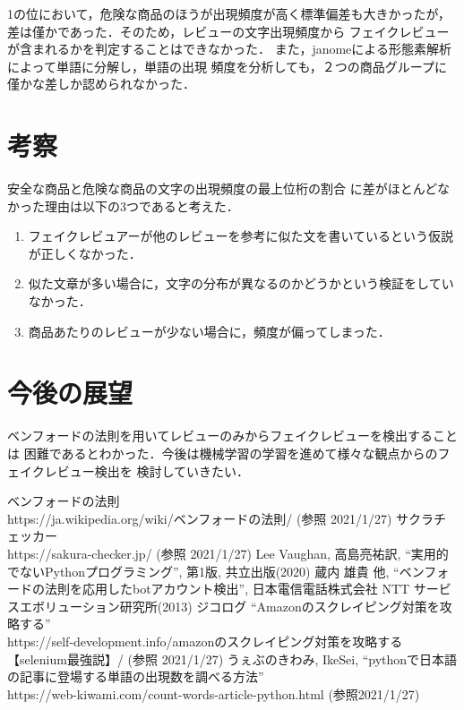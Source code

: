 \documentclass[a4paper, twocolumn]{jsarticle}
\begin{document}
1の位において，危険な商品のほうが出現頻度が高く標準偏差も大きかったが，
差は僅かであった．そのため，レビューの文字出現頻度から
フェイクレビューが含まれるかを判定することはできなかった．
また，janomeによる形態素解析によって単語に分解し，単語の出現
頻度を分析しても，２つの商品グループに僅かな差しか認められなかった．

\section{考察}
安全な商品と危険な商品の文字の出現頻度の最上位桁の割合
に差がほとんどなかった理由は以下の3つであると考えた．

\begin{enumerate}
  \item フェイクレビュアーが他のレビューを参考に似た文を書いているという仮説が正しくなかった．
  \item 似た文章が多い場合に，文字の分布が異なるのかどうかという検証をしていなかった．
  \item 商品あたりのレビューが少ない場合に，頻度が偏ってしまった．
\end{enumerate}


\section{今後の展望}
ベンフォードの法則を用いてレビューのみからフェイクレビューを検出することは
困難であるとわかった．今後は機械学習の学習を進めて様々な観点からのフェイクレビュー検出を
検討していきたい．

\begin{thebibliography}{99}
   ベンフォードの法則 \\ https://ja.wikipedia.org/wiki/ベンフォードの法則/ (参照 2021/1/27)
   サクラチェッカー \\ https://sakura-checker.jp/ (参照 2021/1/27)
   Lee Vaughan, 高島亮祐訳, ``実用的でないPythonプログラミング'', 第1版, 共立出版(2020)
   蔵内 雄貴 他, ``ベンフォードの法則を応用したbotアカウント検出'', 日本電信電話株式会社 NTT サービスエボリューション研究所(2013)
   ジコログ ``Amazonのスクレイピング対策を攻略する'' \\ https://self-development.info/amazonのスクレイピング対策を攻略する【selenium最強説】/ (参照 2021/1/27)
   うぇぶのきわみ, IkeSei, ``pythonで日本語の記事に登場する単語の出現数を調べる方法'' \\ https://web-kiwami.com/count-words-article-python.html (参照2021/1/27)
\end{thebibliography}
\end{document}
